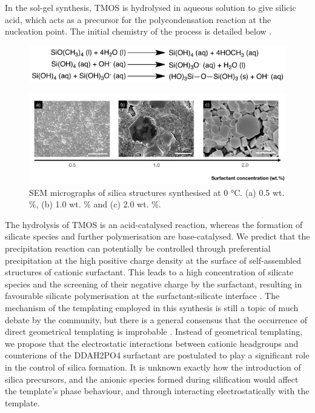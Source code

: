 \documentclass[a4paper,12pt,twocolumn]{article}
\begin{document}
  	In the sol-gel synthesis, TMOS is hydrolysed in aqueous solution to give silicic acid, which acts as a precursor for the polycondensation reaction at the nucleation point. The initial chemistry of the process is detailed below \cite{yang2008}. 
  	
  	\begin{figure}[!h]
		\includegraphics[width=\linewidth]{mechanism.png}
  	\end{figure}
  	
  	  	\begin{figure}[t!]
  	\centering
		\includegraphics[width=\textwidth]{0deg.jpg}
 		\caption{SEM micrographs of silica structures synthesised at 0 °C. (a) 0.5 wt. \%, (b) 1.0 wt. \% and (c) 2.0 wt. \%.}
 	\end{figure}  
  	The hydrolysis of TMOS is an acid-catalysed reaction, whereas the formation of silicate species and further polymerisation are base-catalysed. We predict that the precipitation reaction can potentially be controlled through preferential precipitation at the high positive charge density at the surface of self-assembled structures of cationic surfactant. This leads to a high concentration of silicate species and the screening of their negative charge by the surfactant, resulting in favourable silicate polymerisation at the surfactant-silicate interface \cite{monnier1993}. The mechanism of the templating employed in this synthesis is still a topic of much debate by the community, but there is a general consensus that the occurrence of direct geometrical templating is improbable \cite{colfen2007}. Instead of geometrical templating, we propose that the electrostatic interactions between cationic headgroups and counterions of the DDAH2PO4 surfactant are postulated to play a significant role in the control of silica formation. It is unknown exactly how the introduction of silica precursors, and the anionic species formed during silification would affect the template’s phase behaviour, and through interacting electrostatically with the template.
  	
\end{document}
